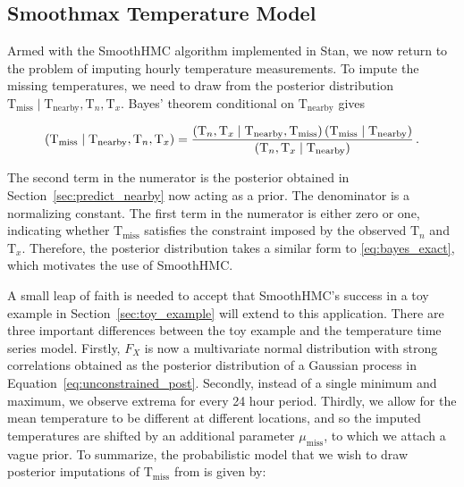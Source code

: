 \documentclass[letter]{article}
\newcommand{\genericdel}[3]{%
      \left#1#3\right#2
    }
\newcommand{\del}[1]{\genericdel(){#1}}
\let\Pr\relax
\DeclareMathOperator{\Pr}{\mathbb{P}}
\newcommand{\T}{\mathrm{T}}
\newcommand{\Tn}{\T_{n}}
\newcommand{\Tx}{\T_{x}}
\newcommand{\miss}{\mathrm{miss}}
\newcommand{\obs}{\mathrm{nearby}}
\begin{document}
        \subsection{Smoothmax Temperature Model}\label{smoothmax-temperature-model}
    


        Armed with the SmoothHMC algorithm implemented in Stan, we now return to the problem of imputing hourly temperature measurements.
To impute the missing temperatures, we need to draw from the posterior distribution \(\T_\miss \mid \T_\obs, \Tn, \Tx\).
Bayes' theorem conditional on \(\T_\obs\) gives

\begin{equation}
    \Pr\del{\T_\miss \mid \T_\obs, \Tn, \Tx} = \frac{
        \Pr\del{\Tn, \Tx \mid \T_\obs, \T_\miss } 
        \Pr\del{\T_\miss \mid \T_\obs}
        }{
        \Pr\del{\Tn, \Tx \mid \T_\obs}
        }\,.
\end{equation}

The second term in the numerator is the posterior obtained in Section~\ref{sec:predict_nearby} now acting as a prior.
The denominator is a normalizing constant.
The first term in the numerator is either zero or one, indicating whether \(\T_\miss\) satisfies the constraint imposed by the observed \(\Tn\) and \(\Tx\).
Therefore, the posterior distribution takes a similar form to \eqref{eq:bayes_exact}, which motivates the use of SmoothHMC.
    


        A small leap of faith is needed to accept that SmoothHMC's success in a toy example in Section~\ref{sec:toy_example} will extend to this application.
There are three important differences between the toy example and the temperature time series model.
Firstly, \(F_X\) is now a multivariate normal distribution with strong correlations obtained as the posterior distribution of a Gaussian process in Equation~\eqref{eq:unconstrained_post}.
Secondly, instead of a single minimum and maximum, we observe extrema for every 24 hour period.
Thirdly, we allow for the mean temperature to be different at different locations,
and so the imputed temperatures are shifted by an additional parameter \(\mu_{\miss}\),
to which we attach a vague prior.
To summarize, the probabilistic model that we wish to draw posterior imputations of \(\T_\miss\) from is given by:
\end{document}
